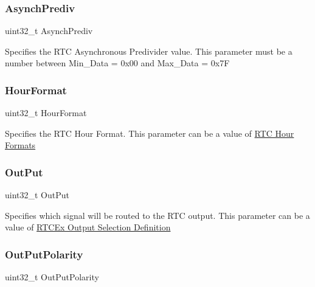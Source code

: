 \subsubsection{\texorpdfstring{Asynch\+Prediv}{AsynchPrediv}}
{\footnotesize\ttfamily uint32\+\_\+t Asynch\+Prediv}

Specifies the R\+TC Asynchronous Predivider value. This parameter must be a number between Min\+\_\+\+Data = 0x00 and Max\+\_\+\+Data = 0x7F \mbox{\label{struct_r_t_c___init_type_def_a6443afafaf63b709dad618a85502ef08}} 
\subsubsection{\texorpdfstring{Hour\+Format}{HourFormat}}
{\footnotesize\ttfamily uint32\+\_\+t Hour\+Format}

Specifies the R\+TC Hour Format. This parameter can be a value of \hyperlink{group___r_t_c___hour___formats}{R\+TC Hour Formats} \mbox{\label{struct_r_t_c___init_type_def_a1ac04944c56d427908f5dec0bd80155f}} 
\subsubsection{\texorpdfstring{Out\+Put}{OutPut}}
{\footnotesize\ttfamily uint32\+\_\+t Out\+Put}

Specifies which signal will be routed to the R\+TC output. This parameter can be a value of \hyperlink{group___r_t_c_ex___output__selection___definitions}{R\+T\+C\+Ex Output Selection Definition} \mbox{\label{struct_r_t_c___init_type_def_a1db55b29ddfca7107f6ef6389e13d423}} 
\subsubsection{\texorpdfstring{Out\+Put\+Polarity}{OutPutPolarity}}
{\footnotesize\ttfamily uint32\+\_\+t Out\+Put\+Polarity}

